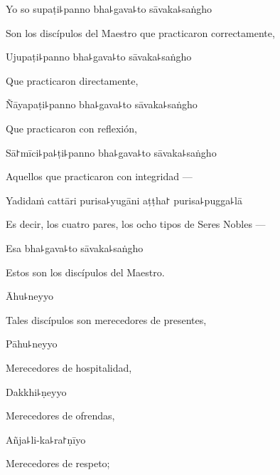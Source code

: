 Yo so supaṭi꜕panno bha꜕gava꜕to sāvaka꜕saṅgho

\begin{english}
  Son los discípulos del Maestro que practicaron correctamente,
\end{english}

Ujupaṭi꜕panno bha꜕gava꜕to sāvaka꜕saṅgho

\begin{english}
  Que practicaron directamente,
\end{english}

Ñāyapaṭi꜕panno bha꜕gava꜕to sāvaka꜕saṅgho

\begin{english}
  Que practicaron con reflexión,
\end{english}

Sā꜓mīci꜕pa꜕ṭi꜕panno bha꜕gava꜕to sāvaka꜕saṅgho

\begin{english}
  Aquellos que practicaron con integridad ---
\end{english}

Yadidaṁ cattāri purisa꜕yugāni aṭṭha꜓ purisa꜕pugga꜕lā

\begin{english}
  Es decir, los cuatro pares, los ocho tipos de Seres Nobles ---
\end{english}

Esa bha꜕gava꜕to sāvaka꜕saṅgho

\begin{english}
 Estos son los discípulos del Maestro.
\end{english}

Āhu꜕neyyo

\begin{english}
  Tales discípulos son merecedores de presentes,
\end{english}

Pāhu꜕neyyo

\begin{english}
  Merecedores de hospitalidad,
\end{english}

\clearpage

Dakkhi꜕ṇeyyo

\begin{english}
  Merecedores de ofrendas,
\end{english}

Añja꜕li-ka꜕ra꜓ṇīyo

\begin{english}
  Merecedores de respeto;
\end{english}

